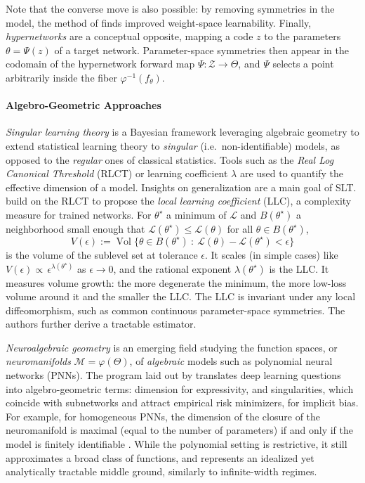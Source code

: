\documentclass[mathematics,review,submit,moreauthors]{Definitions/mdpi}
\begin{document}
Note that the converse move is also possible: by removing symmetries in the model, the method of \citet{lim2024} finds improved weight-space learnability.
Finally, \emph{hypernetworks} \citep{ha2017} are a conceptual opposite, mapping a code $z$ to the parameters $\theta=\Psi(z)$ of a target network.
Parameter-space symmetries then appear in the codomain of the hypernetwork forward map $\Psi:\mathcal Z\to \Theta$, and $\Psi$ selects a point arbitrarily inside the fiber $\varphi^{-1}(f_\theta)$.

\paragraph{Algebro-Geometric Approaches}
\emph{Singular learning theory} \citep[SLT,][]{watanabe2009} is a Bayesian framework leveraging algebraic geometry to extend statistical learning theory to \emph{singular} (i.e.\ non-identifiable) models, as opposed to the \emph{regular} ones of classical statistics.
Tools such as the \emph{Real Log Canonical Threshold} (RLCT) or learning coefficient $\lambda$ are used to quantify the effective dimension of a model.
Insights on generalization are a main goal of SLT.
\citet{lau2025p2icais} build on the RLCT to propose the \emph{local learning coefficient} (LLC), a complexity measure for trained networks.
For $\theta^\star$ a minimum of $\mathcal{L}$ and $B(\theta^\star)$ a neighborhood small enough that $\mathcal{L}(\theta^\star)\le\mathcal{L}(\theta)$ for all $\theta\in B(\theta^\star)$,
\begin{equation*}
    V(\epsilon):=\operatorname{Vol}\big\{\theta\in B(\theta^\star)\ :\ \mathcal{L}(\theta)-\mathcal{L}(\theta^\star)<\epsilon\big\}
\end{equation*}
is the volume of the sublevel set at tolerance $\epsilon$.
It scales (in simple cases) like $V(\epsilon)\propto\,\epsilon^{\lambda(\theta^\star)}$ as $\epsilon\to0$, and the rational exponent $\lambda(\theta^\star)$ is the LLC.
It measures volume growth: the more degenerate the minimum, the more low-loss volume around it and the smaller the LLC.
The LLC is invariant under any local diffeomorphism, such as common continuous parameter-space symmetries.
The authors further derive a tractable estimator.

\emph{Neuroalgebraic geometry} \citep{marchetti2025a} is an emerging field studying the function spaces, or \emph{neuromanifolds} $\mathcal{M}=\varphi(\Theta)$, of \emph{algebraic} models such as polynomial neural networks (PNNs).
The program laid out by \citet{marchetti2025a} translates deep learning questions into algebro-geometric terms: dimension for expressivity, and singularities, which coincide with subnetworks and attract empirical risk minimizers, for implicit bias.
For example, for homogeneous PNNs, the dimension of the closure of the neuromanifold is maximal (equal to the number of parameters) if and only if the model is finitely identifiable \citep{usevich2025}.
While the polynomial setting is restrictive, it still approximates a broad class of functions, and represents an idealized yet analytically tractable middle ground, similarly to infinite-width regimes.
\end{document}
